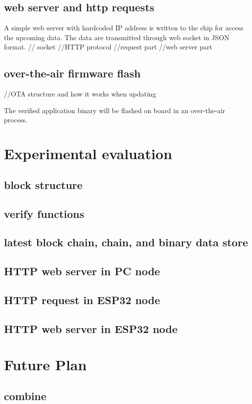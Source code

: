 \documentclass{article}
\begin{document}
    \subsection{web server and http requests}
        A simple web server with hardcoded IP address is written to the chip for access the upcoming data. The data are transmitted through web socket in JSON format.
        // socket
        //HTTP protocol
        //request part
        //web server part

    \subsection{over-the-air firmware flash}
        //OTA structure and how it works when updating

        The verified application binary will be flashed on board in an over-the-air process.

\section{Experimental evaluation}
    \subsection{block structure}
    \subsection{verify functions}
    \subsection{latest block chain, chain, and binary data store}
    \subsection{HTTP web server in PC node}
    \subsection{HTTP request in ESP32 node}
    \subsection{HTTP web server in ESP32 node}

\section{Future Plan}
    \subsection{combine}
\end{document}
